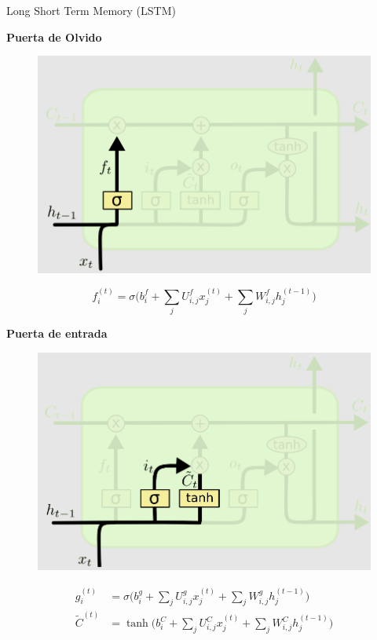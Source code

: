 \begin{frame}{Long Short Term Memory (LSTM)}
\begin{overprint}
        \begin{center} \textbf{Puerta de Olvido} \end{center}
        \begin{figure}
            \centering
            \includegraphics[keepaspectratio=true,height=0.7\paperheight,width=0.7\linewidth]{Images/puerta1.png}
        \end{figure}
        \begin{equation*}
            f^{(t)}_i = \sigma \Big( b^f_i + \sum_j U_{i,j}^f x^{(t)}_j + \sum_j W_{i,j}^f h^{(t-1)}_j \Big) 
        \end{equation*}

        \begin{center} \textbf{Puerta de entrada} \end{center}
        \begin{figure}
            \centering
            \vspace{-0.5cm}
            \includegraphics[keepaspectratio=true,height=0.45\paperheight,width=0.7\linewidth]{Images/puerta2.png}
        \end{figure}
        \begin{equation*}
            \begin{aligned}
                g^{(t)}_i & = \sigma \Big( b^g_i + \sum_j U_{i,j}^g x^{(t)}_j + \sum_j W_{i,j}^g h^{(t-1)}_j \Big) \\
                \tilde{C}^{(t)} & = \tanh \Big( b^C_i + \sum_j U^C_{i,j}x^{(t)}_j + \sum_j W^C_{i,j} h^{(t-1)}_j \Big)
            \end{aligned}
        \end{equation*}
       

\end{overprint}
\end{frame}
